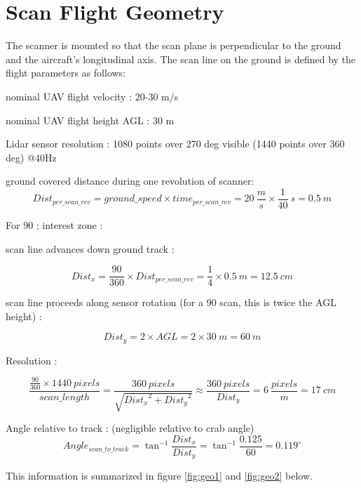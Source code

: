 \documentclass[a4paper,11pt]{report}
\begin{document}
\section{Scan Flight Geometry}
\label{geometry}

The scanner is mounted so that the scan plane is perpendicular to the ground and the aircraft's longitudinal axis. The scan line on the ground is defined by the flight parameters as follows:

nominal UAV flight velocity : 20-30 m/s

nominal UAV flight height AGL : 30 m

Lidar sensor resolution : 1080 points over 270 deg visible (1440 points over 360 deg) @40Hz

ground covered distance during one revolution of scanner:
\begin{equation}
Dist_{per\_scan\_rev} = ground\_speed \times time_{per\_scan\_rev} = 20~\frac{m}{s} \times \frac{1}{40}~s = 0.5~m 
\end{equation}

For 90 \degree; interest zone :

scan line advances down ground track :

\begin{equation} 
Dist_{x}=  \frac{90}{360} \times Dist_{per\_scan\_rev} = \frac{1}{4} \times 0.5~m = 12.5~cm
\end{equation}

scan line proceeds along sensor rotation (for a 90 scan, this is twice the AGL height) :

\begin{equation} 
Dist_{y}=  2 \times AGL = 2 \times 30~m = 60~m
\end{equation}

Resolution :

\begin{equation}  
\frac{ \frac{90}{360} \times 1440~pixels }{scan\_length} = 
\frac{360~pixels}{\sqrt{{Dist_x}^2+{Dist_y}^2}} \approx \frac{360~pixels}{Dist_y}= 6~ \frac{pixels}{m} = 17~cm
\end{equation}

Angle relative to track : (negligible relative to crab angle)
\begin{equation} Angle_{scan\_to\_track} = \tan^{-1} \frac{Dist_x}{Dist_y} = \tan^{-1} \frac{0.125}{60} = 0.119^\circ
\end{equation}

This information is summarized in figure \ref{fig:geo1} and \ref{fig:geo2} below.
\end{document}
